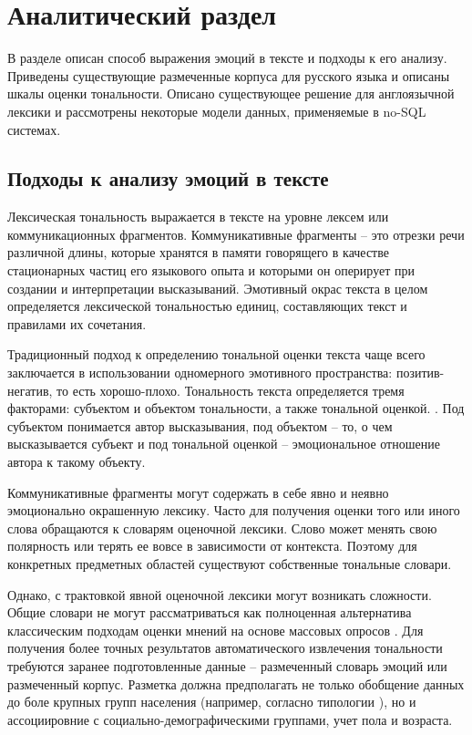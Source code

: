\chapter{Аналитический раздел}\label{sec:analyth}
В разделе описан способ выражения эмоций в тексте и подходы к его анализу. Приведены существующие размеченные корпуса для русского языка и описаны шкалы оценки тональности. Описано существующее решение для англоязычной лексики и рассмотрены некоторые модели данных, применяемые в no-SQL системах.  
\section{Подходы к анализу эмоций в тексте}
Лексическая тональность выражается в тексте на уровне лексем или коммуникационных фрагментов. Коммуникативные фрагменты -- это отрезки речи различной длины, которые хранятся в памяти говорящего в качестве стационарных частиц его языкового опыта и которыми он оперирует при создании и интерпретации высказываний. \cite{Гаспаров1996} Эмотивный окрас текста в целом определяется лексической тональностью единиц, составляющих текст и правилами их сочетания.

Традиционный подход к определению тональной оценки текста чаще всего заключается в использовании одномерного эмотивного пространства: позитив-негатив, то есть хорошо-плохо. Тональность текста определяется тремя факторами: субъектом и объектом тональности, а также тональной оценкой. \cite{Пазельская2011}. Под субъектом понимается автор высказывания, под объектом -- то, о чем высказывается субъект и под тональной оценкой -- эмоциональное отношение автора к такому объекту. 

Коммуникативные фрагменты могут содержать в себе явно и неявно эмоционально окрашенную лексику. Часто для получения оценки того или иного слова обращаются к словарям оценочной лексики. Слово может менять свою полярность или терять ее вовсе в зависимости от контекста. Поэтому для конкретных предметных областей существуют собственные тональные словари. \cite{Kanayama2006}

Однако, с трактовкой явной оценочной лексики могут возникать сложности. Общие словари не могут рассматриваться как полноценная альтернатива классическим подходам оценки мнений на основе массовых опросов \cite{Дудина2017}. Для получения более точных результатов автоматического извлечения тональности требуются заранее подготовленные данные -- размеченный словарь эмоций или размеченный корпус. Разметка должна предполагать не только обобщение данных до боле крупных групп населения (например, согласно типологии \cite{Zubarevich2013}), но и ассоциировние с социально-демографическими группами, учет пола и возраста.

